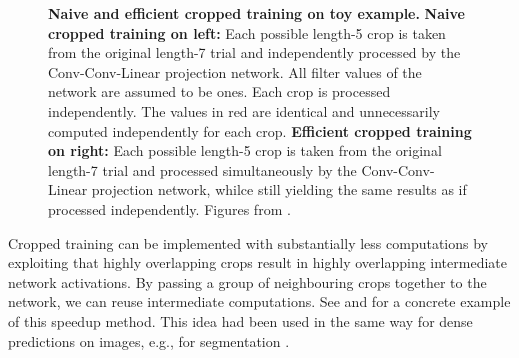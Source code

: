 \begin{figure}[h!tb]
    \myfloatalign
     \quad
    \caption[Naive and efficient cropped training]{\textbf{Naive and efficient cropped training on toy example.} \textbf{Naive cropped training on left:} Each possible length-5 crop
is taken from the original length-7 trial and independently processed by
the Conv-Conv-Linear projection network. All filter values of the
network are assumed to be ones. Each crop is processed independently.
The values in red are identical and unnecessarily computed independently
for each crop. \textbf{Efficient cropped training on right:} Each possible length-5 crop is
    taken from the original length-7 trial and processed simultaneously by
    the Conv-Conv-Linear projection network, whilce still yielding the same
    results as if processed independently.  Figures from
    \citet{schirrmeisterdeephbm2017}.}\label{cropped-naive-and-efficeint-figure}
\end{figure}



    Cropped training can be implemented with substantially less computations
by exploiting that highly overlapping crops result in highly overlapping
intermediate network activations. By passing a group of neighbouring
crops together to the network, we can reuse intermediate computations.
See  and
 for a concrete
example of this speedup method. This idea had been used in the same way
for dense predictions on images, e.g., for segmentation
\citep{giusti_fast_2013,nasse_face_2009,sermanet_overfeat:_2013,shelhamer_fully_2016}.

